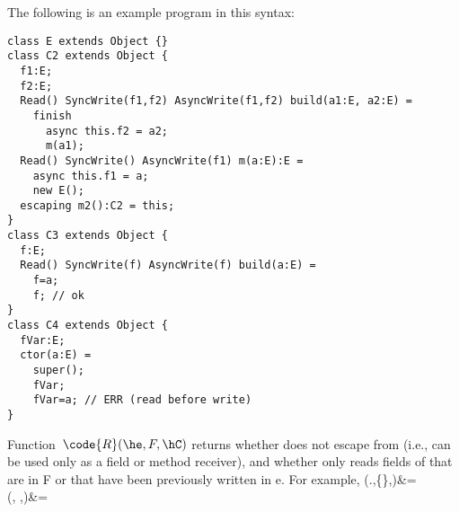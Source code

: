 The following is an example program in this syntax:

\begin{lstlisting}
class E extends Object {}
class C2 extends Object {
  f1:E;
  f2:E;
  Read() SyncWrite(f1,f2) AsyncWrite(f1,f2) build(a1:E, a2:E) =
    finish
      async this.f2 = a2;
      m(a1);
  Read() SyncWrite() AsyncWrite(f1) m(a:E):E =
    async this.f1 = a;
    new E();
  escaping m2():C2 = this;
}
class C3 extends Object {
  f:E;
  Read() SyncWrite(f) AsyncWrite(f) build(a:E) =
    f=a;
    f; // ok
}
class C4 extends Object {
  fVar:E;
  ctor(a:E) =
    super();
    fVar;
    fVar=a; // ERR (read before write)
}
\end{lstlisting}




























\newcommand{\R}[2]{\code{R}(#1,#2,\hC)}
\newcommand{\SW}[1]{\code{SW}(#1,\hC)}
\newcommand{\AW}[1]{\code{AW}(#1,\hC)}

Function~$\R{\he}{F}$ returns whether
    \this does not escape from \he (i.e., \this can be used only as a field or method receiver),
    and whether
    \he only reads fields of \this that are in F or that have been previously written in e.
For example,
    \R{\this.\hf}{\{\hf\}}&=\htrue\\
    \R{}{ \emptyset}&=\htrue\\
\eeq

